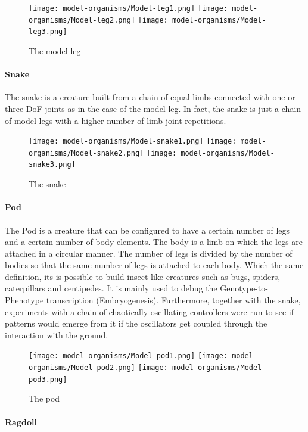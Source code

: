\documentclass[main]{subfiles}
\begin{document}
\begin{figure}[H]
\centering
\texttt{[image: model-organisms/Model-leg1.png]}
\texttt{[image: model-organisms/Model-leg2.png]}
\texttt{[image: model-organisms/Model-leg3.png]}
\caption[The model leg]{The model leg}
\label{figure:model-leg}
\end{figure}

\paragraph{Snake}

The snake is a creature built from a chain of equal limbs connected with one or three DoF joints as in the case of the model leg. In fact, the snake is just a chain of model legs with a higher number of limb-joint repetitions. 

\begin{figure}[H]
\centering
\texttt{[image: model-organisms/Model-snake1.png]}
\texttt{[image: model-organisms/Model-snake2.png]}
\texttt{[image: model-organisms/Model-snake3.png]}
\caption[The snake]{The snake}
\label{figure:snake}
\end{figure}

\paragraph{Pod}

The Pod is a creature that can be configured to have a certain number of legs and a certain number of body elements. The body is a limb on which the legs are attached in a circular manner. The number of legs is divided by the number of bodies so that the same number of legs is attached to each body. Which the same definition, its is possible to build insect-like creatures such as bugs, spiders, caterpillars and centipedes. It is mainly used to debug the Genotype-to-Phenotype transcription (Embryogenesis). Furthermore, together with the snake, experiments with a chain of chaotically oscillating controllers were run to see if patterns would emerge from it if the oscillators get coupled through the interaction with the ground.

\begin{figure}[H]
\centering
\texttt{[image: model-organisms/Model-pod1.png]}
\texttt{[image: model-organisms/Model-pod2.png]}
\texttt{[image: model-organisms/Model-pod3.png]}
\caption[The pod]{The pod}
\label{figure:pod}
\end{figure}

\paragraph{Ragdoll}
\end{document}
